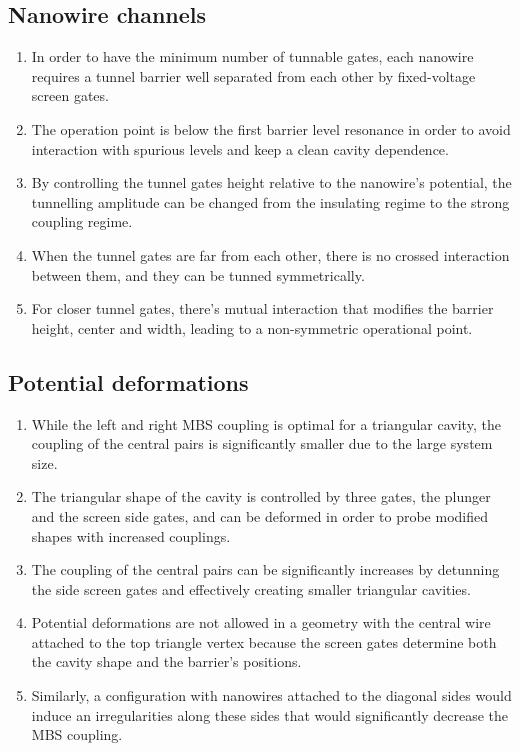\subsection{Nanowire channels}
\begin{enumerate}
\item In order to have the minimum number of tunnable gates, each nanowire requires a tunnel barrier well separated from each other by fixed-voltage screen gates.
\item The operation point is below the first barrier level resonance in order to avoid interaction with spurious levels and keep a clean cavity dependence.
\item By controlling the tunnel gates height relative to the nanowire's potential, the tunnelling amplitude can be changed from the insulating regime to the strong coupling regime.
\item When the tunnel gates are far from each other, there is no crossed interaction between them, and they can be tunned symmetrically.
\item For closer tunnel gates, there's mutual interaction that modifies the barrier height, center and width, leading to a non-symmetric operational point.
\end{enumerate}
\subsection{Potential deformations}
\begin{enumerate}
\item While the left and right MBS coupling is optimal for a triangular cavity, the coupling of the central pairs is significantly smaller due to the large system size.
\item The triangular shape of the cavity is controlled by three gates, the plunger and the screen side gates, and can be deformed in order to probe modified shapes with increased couplings.
\item The coupling of the central pairs can be significantly increases by detunning the side screen gates and effectively creating smaller triangular cavities.
\item Potential deformations are not allowed in a geometry with the central wire attached to the top triangle vertex because the screen gates determine both the cavity shape and the barrier's positions.
\item Similarly, a configuration with nanowires attached to the diagonal sides would induce an irregularities along these sides that would significantly decrease the MBS coupling.
\end{enumerate}

